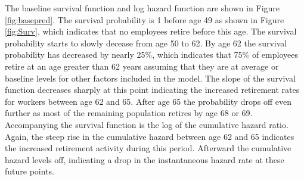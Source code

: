 \documentclass[12pt,letterpaper]{article}
\begin{document}
The baseline survival function and log hazard function are shown in Figure \ref{fig:basepred}. The survival probability is 1 before age 49 as shown in Figure \ref{fig:Surv}, which indicates that no employees retire before this age. The survival probability starts to slowly decease from age 50 to 62. By age 62 the survival probability has decreased by nearly 25\%, which indicates that 75\% of employees retire at an age greater than 62 years assuming that they are at average or baseline levels for other factors included in the model.  The slope of the survival function decreases sharply at this point indicating the increased retirement rates for workers between age 62 and 65.  After age 65 the probability drops off even further as most of the remaining population retires by age 68 or 69. Accompanying the survival function is the log of the cumulative hazard ratio.  Again, the steep rise in the cumulative hazard between age 62 and 65 indicates the increased retirement activity during this period.  Afterward the cumulative hazard levels off, indicating a drop in the instantaneous hazard rate at these future points.
\end{document}
